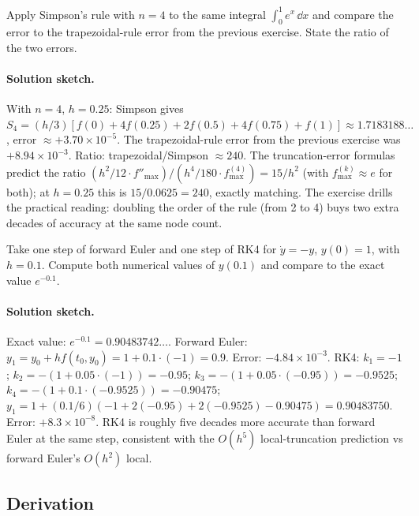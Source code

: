 \begin{exercise}
Apply Simpson's rule with $n = 4$ to the same integral
$\int_{0}^{1} e^{x}\, \dd x$ and compare the error to the
trapezoidal-rule error from the previous exercise. State the
ratio of the two errors.
\end{exercise}

\paragraph{Solution sketch.}
With $n = 4$, $h = 0.25$: Simpson gives
$S_{4} = (h/3) [f(0) + 4 f(0.25) + 2 f(0.5) + 4 f(0.75) + f(1)]
\approx 1.7183188\ldots$, error $\approx +3.70 \times 10^{-5}$.
The trapezoidal-rule error from the previous exercise was
$+8.94 \times 10^{-3}$. Ratio: trapezoidal/Simpson
$\approx 240$. The truncation-error formulas predict the ratio
$(h^{2}/12 \cdot f''_{\max}) / (h^{4}/180 \cdot f^{(4)}_{\max})
= 15 / h^{2}$ (with $f^{(k)}_{\max} \approx e$ for both); at
$h = 0.25$ this is $15 / 0.0625 = 240$, exactly matching. The
exercise drills the practical reading: doubling the order of the
rule (from 2 to 4) buys two extra decades of accuracy at the
same node count.

\begin{exercise}
Take one step of forward Euler and one step of RK4 for $\dot{y} =
-y$, $y(0) = 1$, with $h = 0.1$. Compute both numerical values of
$y(0.1)$ and compare to the exact value $e^{-0.1}$.
\end{exercise}

\paragraph{Solution sketch.}
Exact value: $e^{-0.1} = 0.90483742\ldots$. Forward Euler:
$y_{1} = y_{0} + h f(t_{0}, y_{0}) = 1 + 0.1 \cdot (-1) = 0.9$.
Error: $-4.84 \times 10^{-3}$.
RK4: $k_{1} = -1$; $k_{2} = -(1 + 0.05 \cdot (-1)) = -0.95$;
$k_{3} = -(1 + 0.05 \cdot (-0.95)) = -0.9525$;
$k_{4} = -(1 + 0.1 \cdot (-0.9525)) = -0.90475$;
$y_{1} = 1 + (0.1/6)(-1 + 2(-0.95) + 2(-0.9525) - 0.90475)
= 0.90483750$. Error: $+8.3 \times 10^{-8}$. RK4 is roughly five
decades more accurate than forward Euler at the same step,
consistent with the $O(h^{5})$ local-truncation prediction vs
forward Euler's $O(h^{2})$ local.

\subsection*{Derivation}

